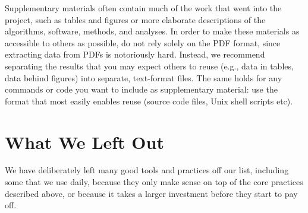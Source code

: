 \documentclass[10pt]{article}
\begin{document}
Supplementary materials often contain much of the work that went into
the project, such as tables and figures or more elaborate descriptions
of the algorithms, software, methods, and analyses. In order to make
these materials as accessible to others as possible, do not rely
solely on the PDF format, since extracting data from PDFs is
notoriously hard.  Instead, we recommend separating the results that
you may expect others to reuse (e.g., data in tables, data behind
figures) into separate, text-format files. The same holds for any
commands or code you want to include as supplementary material: use
the format that most easily enables reuse (source code files, Unix
shell scripts etc).

\section{What We Left Out}\label{sec:omitted}

We have deliberately left many good tools and practices off our list,
including some that we use daily, because they only make sense on top
of the core practices described above, or because it takes a larger
investment before they start to pay off.
\end{document}
